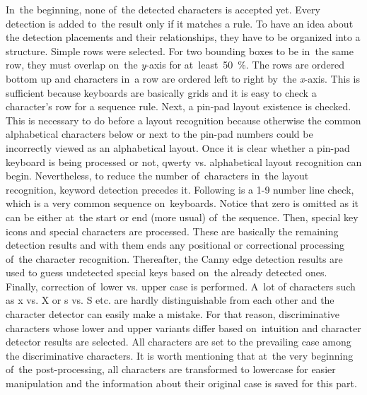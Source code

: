 In~the beginning, none of~the detected characters is accepted yet. Every detection is added to~the result only if it matches a rule. To have an idea about the detection placements and their relationships, they have to be organized into a structure. Simple rows were selected. For two bounding boxes to be in~the same row, they must overlap on~the \emph{y}-axis for at~least~50~\%. The rows are ordered bottom up and characters in~a row are ordered left to right by~the \emph{x}-axis. This is sufficient because keyboards are basically grids and it is easy to check a character's row for a sequence rule. Next, a pin-pad layout existence is checked. This is necessary to do before a layout recognition because otherwise the common alphabetical characters below or next to the pin-pad numbers could be incorrectly viewed as an alphabetical layout. Once it is clear whether a pin-pad keyboard is being processed or not, qwerty vs. alphabetical layout recognition can begin. Nevertheless, to reduce the number of~characters in~the layout recognition, keyword detection precedes it. Following is a 1-9 number line check, which is a very common sequence on~keyboards. Notice that zero is omitted as it can be either at~the start or end (more usual) of~the sequence. Then, special key icons and special characters are processed. These are basically the remaining detection results and with them ends any positional or correctional processing of~the character recognition. Thereafter, the Canny edge detection results are used to guess undetected special keys based on~the already detected ones. Finally, correction of~lower vs. upper case is performed. A~lot of characters such as x vs. X or s vs. S etc. are hardly distinguishable from each other and the character detector can easily make a mistake. For that reason, discrimi\-native characters  whose lower and upper variants differ based on~intuition and character detector results are selected. All characters are set to the prevailing case among the discriminative characters. It is worth mentioning that at~the very beginning of~the post-processing, all characters are transformed to lowercase for easier manipulation and the information about their original case is saved for this part.


